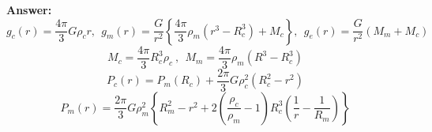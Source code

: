 {\begin{minipage}{0.9\textwidth}
\begin{problem}
{{\bf Answer:}
\begin{equation}
  g_c(r) = \frac{4\pi}{3}G \rho_c r
  ,~~
  g_m(r) = \frac{G}{r^2}
           \left \{
             \frac{4\pi}{3} \rho_m 
              \left (
                     r^3 - R_c^3
             \right )
             + M_c
          \right \}
  ,~~
  g_e(r) = \frac{G}{r^2}\left ( M_m + M_c \right )
\end{equation}
\begin{equation}
  M_c = \frac{4\pi}{3} R_c^3 \rho_c 
  ~,~~
  M_m = \frac{4\pi}{3} \rho_m \left ( R^3 - R_c^3 \right )
\end{equation}
\begin{equation}
   P_c(r) = P_m(R_c) + 
            \frac{2\pi}{3} G \rho_c^2 \left ( R_c^2 - r^2 \right )
\end{equation}
\begin{equation}
   P_m(r) = \frac{2\pi}{3} G \rho_m^2 
           \left \{ R_m^2 - r^2 
                    +
                   2 \left (
                       \frac{\rho_c}{\rho_m} -1
                    \right )
                   R_c^3 \left (
                           \frac{1}{r} - \frac{1}{R_m}
                        \right )
          \right \}
\label{eqn_P_2layer_model}
\end{equation}
}
\end{problem}
\end{minipage}
}

